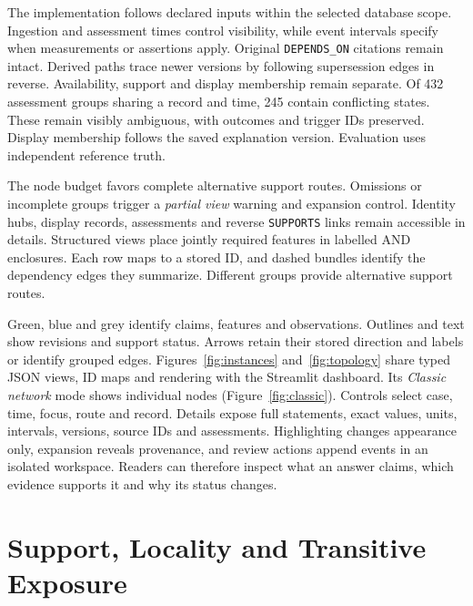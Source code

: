 \documentclass[runningheads]{llncs}
\newcommand{\SemAssessmentTies}{432}
\newcommand{\SemAssessmentConflicts}{245}
\begin{document}
The implementation follows declared inputs within the selected database
scope. Ingestion and assessment times control visibility, while event
intervals specify when measurements or assertions apply.
Original \texttt{DEPENDS\_ON} citations remain intact. Derived paths trace
newer versions by following supersession edges in reverse.
Availability, support and display membership remain separate.
Of \SemAssessmentTies{} assessment groups sharing a record and time,
\SemAssessmentConflicts{} contain conflicting states. These remain visibly
ambiguous, with outcomes and trigger IDs preserved. Display membership
follows the saved explanation version. Evaluation uses independent
reference truth.

The node budget favors complete alternative support routes.
Omissions or incomplete groups trigger a \emph{partial view} warning
and expansion control. Identity hubs, display records, assessments and
reverse \texttt{SUPPORTS} links remain accessible in details.
Structured views place jointly required features in labelled AND
enclosures. Each row maps to a stored ID, and dashed bundles identify
the dependency edges they summarize. Different groups provide alternative
support routes.

Green, blue and grey identify claims, features and observations.
Outlines and text show revisions and support status. Arrows retain their
stored direction and labels or identify grouped edges.
Figures~\ref{fig:instances} and~\ref{fig:topology} share typed JSON views,
ID maps and rendering with the Streamlit dashboard.
Its \emph{Classic network} mode shows individual nodes
(Figure~\ref{fig:classic}). Controls select case, time, focus, route and
record. Details expose full statements, exact values, units, intervals,
versions, source IDs and assessments. Highlighting changes appearance
only, expansion reveals provenance, and review actions append events
in an isolated workspace. Readers can therefore inspect what an answer
claims, which evidence supports it and why its status changes.








\section{Support, Locality and Transitive Exposure}
\label{sec:theory}
\end{document}
